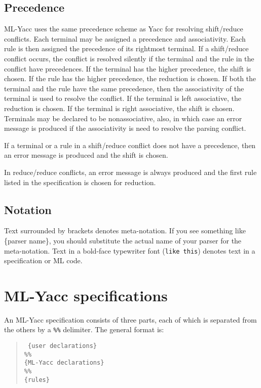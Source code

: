 \subsection{Precedence}
ML-Yacc uses the same precedence scheme as Yacc for resolving
shift/reduce conflicts.  Each terminal may be assigned a precedence and
associativity.  Each rule is then assigned the precedence of its rightmost
terminal.  If a shift/reduce conflict occurs, the conflict is resolved
silently if the terminal and the rule in the conflict have
precedences.
If the terminal has the higher precedence, the shift is chosen.  If
the rule has the higher precedence, the reduction is chosen.  If both
the terminal and the rule have the same precedence, then the associativity
of the terminal is used to resolve the conflict.  If the terminal is
left associative, the reduction is chosen.  If the terminal is 
right associative, the shift is chosen.   Terminals may be declared to 
be nonassociative, also, in which case an error message is produced
if the associativity is need to resolve the parsing conflict.

If a terminal or a rule in a shift/reduce conflict does not have
a precedence, then an error message is produced and the shift
is chosen.

In reduce/reduce conflicts, an error message is always produced and
the first rule listed in the specification is chosen for reduction.
\subsection{Notation}

Text surrounded by brackets denotes meta-notation.  If you see
something like \{parser name\}, you should substitute the actual
name of your parser for the meta-notation.  Text in a bold-face
typewriter font ({\tt like this}) denotes text in a specification 
or ML code.

\section{ML-Yacc specifications}

An ML-Yacc specification consists of three parts, each of which is
separated from the others by a {\tt \%\%} delimiter.  The general format is:
\begin{quote}
\tt
        \{user declarations\} \\
        \%\% \\
        \{ML-Yacc declarations\} \\
        \%\% \\
        \{rules\}
\end{quote}

